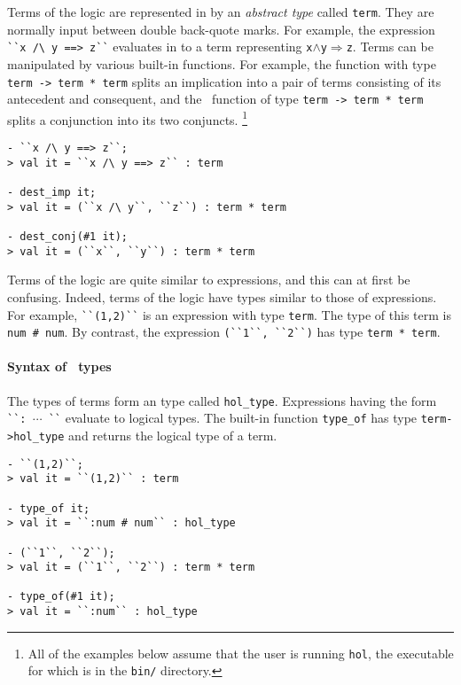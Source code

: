 Terms of the \HOL{} logic are represented in \ML{} by an {\it abstract
  type\/} called {\small\verb|term|}. They are normally input between
double back-quote marks.  For example, the expression
{\small\verb|``x /\ y ==> z``|} evaluates in \ML{} to a term representing
{\small\verb|x|}$\wedge${\small\verb|y|}$\Rightarrow${\small\verb|z|}.
Terms can be manipulated by various built-in \ML{} functions. For
example, the \ML{} function  with \ML{} type
{\small\verb|term -> term * term|} splits an implication into a pair
of terms consisting of its antecedent and consequent, and the \ML\
function  of type {\small\verb|term -> term * term|}
splits a conjunction into its two conjuncts. \footnote
{All of the examples below assume that the user is running
\texttt{hol}, the executable for which is in the \texttt{bin/}
directory.}

\setcounter{sessioncount}{0}
\begin{session}
\begin{verbatim}
- ``x /\ y ==> z``;
> val it = ``x /\ y ==> z`` : term

- dest_imp it;
> val it = (``x /\ y``, ``z``) : term * term

- dest_conj(#1 it);
> val it = (``x``, ``y``) : term * term
\end{verbatim}
\end{session}

Terms of the \HOL{} logic are quite similar to \ML{} expressions, and
this can at first be confusing.  Indeed, terms of the logic have types
similar to those of \ML{} expressions.  For example,
{\small\verb|``(1,2)``|} is an \ML{} expression with \ML{} type
{\small\verb|term|}.  The \HOL{} type of this term is
{\small\verb|num # num|}.  By contrast, the \ML{} expression
{\small\verb|(``1``, ``2``)|} has type {\small\verb|term * term|}.

\paragraph{Syntax of \HOL\ types}

The types of \HOL{} terms form an \ML{} type called
{\small\verb|hol_type|}.  Expressions having the form
{\small\verb|``: |}$\cdots${\small\verb| ``|} evaluate to logical
types.  The built-in function {\small\verb|type_of|} has \ML{} type
{\small\verb|term->hol_type|} and returns the logical type of a term.

\begin{session}
\begin{verbatim}
- ``(1,2)``;
> val it = ``(1,2)`` : term

- type_of it;
> val it = ``:num # num`` : hol_type

- (``1``, ``2``);
> val it = (``1``, ``2``) : term * term

- type_of(#1 it);
> val it = ``:num`` : hol_type
\end{verbatim}
\end{session}

